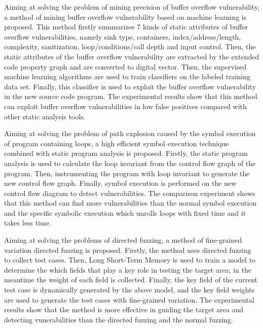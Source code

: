 \begin{eabstract}
Aiming at solving the problem of mining precision of buffer overflow vulnerability, a method of mining buffer overflow vulnerability based on machine learning is proposed. This method firstly summarizes 7 kinds of static attributes of buffer overflow vulnerabilities, namely sink type, containers, index/address/length, complexity, sanitization, loop/conditions/call depth and input control. Then, the static attributes of the buffer overflow vulnerability are extracted by the extended code property graph and are converted to digital vector. Then, the supervised machine learning algorithms are used to train classifiers on the labeled training data set. Finally, this classifier is used to exploit the buffer overflow vulnerability in the new source code program. The experimental results show that this method can exploit buffer overflow vulnerabilities in low false positives compared with other static analysis tools.

Aiming at solving the problem of path explosion caused by the symbol execution of program containing loops, a high efficient symbol execution technique combined with static program analysis is proposed. Firstly, the static program analysis is used to calculate the loop invariant from the control flow graph of the program. Then, instrumenting the program with loop invariant to generate the new control flow graph. Finally, symbol execution is performed on the new control flow diagram to detect vulnerabilities. The comparison experiment shows that this method can find more vulnerabilities than the normal symbol execution and the specific symbolic execution which unrolls loops with fixed time and it takes less time. 

Aiming at solving the problems of directed fuzzing, a method of fine-grained variation directed fuzzing is proposed. Firstly, the method uses directed fuzzing to collect test cases. Then, Long Short-Term Memory is used to train a model to determine the which fields that play a key role in testing the target area; in the meantime the weight of each field is collected. Finally, the key field of the current test case is dynamically generated by the above model, and the key field weights are used to generate the test cases with fine-grained variation. The experimental results show that the method is more effective in guiding the target area and detecting vunerabilities than the directed fuzzing and the normal fuzzing.


\end{eabstract}

